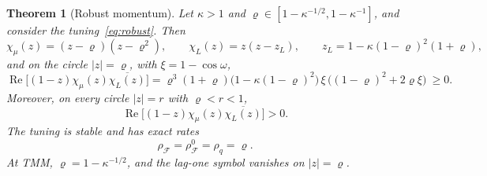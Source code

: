 \documentclass[11pt]{article}
\newtheorem{theorem}{Theorem}[section]
\theoremstyle{definition}
\theoremstyle{remark}
\newcommand{\cF}{\mathcal F}
\newcommand{\Rea}{\operatorname{Re}}
\newcommand{\rhoF}{\rho_{\cF}}
\newcommand{\rhoz}{\rho_{\cF}^{0}}
\begin{document}
\begin{theorem}[Robust momentum]\label{thm:robust}
Let \(\kappa>1\) and \(\varrho\in[1-\kappa^{-1/2},1-\kappa^{-1}]\), and consider the tuning~\eqref{eq:robust}.  Then
\[
\chi_\mu(z)=(z-\varrho)(z-\varrho^2),\qquad \chi_L(z)=z(z-z_L),\qquad z_L=1-\kappa(1-\varrho)^2(1+\varrho),
\]
and on the circle \(|z|=\varrho\), with \(\xi=1-\cos\omega\),
\[
\Rea\bigl[(1-z)\chi_\mu(z)\overline{\chi_L(z)}\bigr]=\varrho^3(1+\varrho)\bigl(1-\kappa(1-\varrho)^2\bigr)\,\xi\,\bigl((1-\varrho)^2+2\varrho\xi\bigr)\ \ge0 .
\]
Moreover, on every circle \(|z|=r\) with \(\varrho<r<1\),
\[
\Rea\bigl[(1-z)\chi_\mu(z)\overline{\chi_L(z)}\bigr]>0 .
\]
The tuning is stable and has exact rates
\[
\rhoF=\rhoz=\rho_q=\varrho .
\]
At TMM, \(\varrho=1-\kappa^{-1/2}\), and the lag-one symbol vanishes on \(|z|=\varrho\).
\end{theorem}
\end{document}
